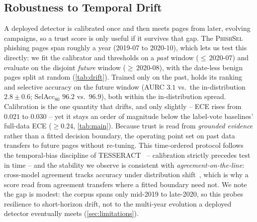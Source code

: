 \subsection{Robustness to Temporal Drift}
\label{sec:exp_drift}
A deployed detector is calibrated once and then meets pages from later, evolving campaigns,
so a trust score is only useful if it survives that gap. The \textsc{PhishSel} phishing pages
span roughly a year (2019-07 to 2020-10), which lets us test this directly: we fit the
calibrator and thresholds on a \emph{past} window ($\le$\,2020-07) and evaluate on the
disjoint \emph{future} window ($\ge$\,2020-08), with the date-less benign pages split at
random (\autoref{tab:drift}). Trained only on the past, \toolname{} holds its ranking and
selective accuracy on the future window (AURC $3.1$ vs.\ the in-distribution $2.8\pm0.6$;
SelAcc$_{80}$ $96.2$ vs.\ $96.9$), both within the in-distribution spread. Calibration is the
one quantity that drifts, and only slightly -- ECE rises from $0.021$ to $0.030$ -- yet it
stays an order of magnitude below the label-vote baselines' full-data ECE ($\ge0.24$,
\autoref{tab:main}). Because trust is read from \emph{grounded evidence} rather than a fitted
decision boundary, the operating point set on past data transfers to future pages without
re-tuning. This time-ordered protocol follows the temporal-bias discipline of
TESSERACT~\cite{pendlebury2019tesseract} -- calibration strictly precedes test in time --
and the stability we observe is consistent with \emph{agreement-on-the-line}: cross-model
agreement tracks accuracy under distribution shift~\cite{baek2022agreement}, which is why
a score read from agreement transfers where a fitted boundary need not. We note the gap is
modest: the corpus spans only mid-2019 to late-2020, so this probes resilience to short-horizon
drift, not to the multi-year evolution a deployed detector eventually meets
(\autoref{sec:limitations}).

